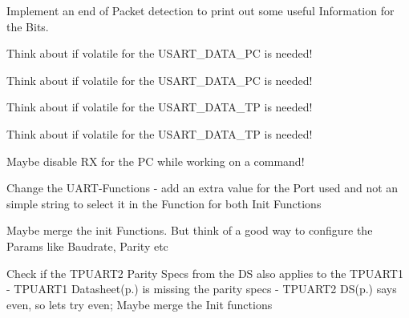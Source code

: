 
\begin{DoxyRefList}
\item[\label{todo__todo000002}%
\hypertarget{todo__todo000002}{}%
Global \hyperlink{shell_8h_ad95c9c45c97cc744ca49a98494bf9465}{act\+\_\+busmon} (void)]Implement an end of Packet detection to print out some useful Information for the Bits. 
\item[\label{todo__todo000008}%
\hypertarget{todo__todo000008}{}%
Global \hyperlink{_u_a_r_t_8c_a6c9949e5146d1feb028b0c2db8754523}{I\+SR} (U\+S\+A\+R\+T\+C1\+\_\+\+R\+X\+C\+\_\+vect)]Think about if volatile for the U\+S\+A\+R\+T\+\_\+\+D\+A\+T\+A\+\_\+\+PC is needed!  
\item[\label{todo__todo000009}%
\hypertarget{todo__todo000009}{}%
Global \hyperlink{_u_a_r_t_8c_acdf978f69a52b8a2225b0536b5fbff0e}{I\+SR} (U\+S\+A\+R\+T\+C1\+\_\+\+D\+R\+E\+\_\+vect)]Think about if volatile for the U\+S\+A\+R\+T\+\_\+\+D\+A\+T\+A\+\_\+\+PC is needed! 
\item[\label{todo__todo000007}%
\hypertarget{todo__todo000007}{}%
Global \hyperlink{_u_a_r_t_8c_abbfd0611f43db59ea4fdb1ea434cf017}{I\+SR} (U\+S\+A\+R\+T\+C0\+\_\+\+D\+R\+E\+\_\+vect)]Think about if volatile for the U\+S\+A\+R\+T\+\_\+\+D\+A\+T\+A\+\_\+\+TP is needed! 
\item[\label{todo__todo000006}%
\hypertarget{todo__todo000006}{}%
Global \hyperlink{_u_a_r_t_8c_aace195abde7bc36b7b50772ff2277dd4}{I\+SR} (U\+S\+A\+R\+T\+C0\+\_\+\+R\+X\+C\+\_\+vect)]Think about if volatile for the U\+S\+A\+R\+T\+\_\+\+D\+A\+T\+A\+\_\+\+TP is needed! 
\item[\label{todo__todo000001}%
\hypertarget{todo__todo000001}{}%
File \hyperlink{shell_8c}{shell.c} ]Maybe disable RX for the PC while working on a command!  
\item[\label{todo__todo000003}%
\hypertarget{todo__todo000003}{}%
File \hyperlink{_u_a_r_t_8c}{U\+A\+RT.c} ]Change the U\+A\+R\+T-\/\+Functions -\/ add an extra value for the Port used and not an simple string to select it in the Function for both Init Functions  
\item[\label{todo__todo000005}%
\hypertarget{todo__todo000005}{}%
Global \hyperlink{_u_a_r_t_8h_a267c0b0bf7f4f8b70049d91449590cf8}{usart\+\_\+init\+\_\+pc} (void)]Maybe merge the init Functions. But think of a good way to configure the Params like Baudrate, Parity etc  
\item[\label{todo__todo000004}%
\hypertarget{todo__todo000004}{}%
Global \hyperlink{_u_a_r_t_8h_a09e438e4f709b00836cebb0d6a44f223}{usart\+\_\+init\+\_\+tpuart} (void)]Check if the T\+P\+U\+A\+R\+T2 Parity Specs from the DS also applies to the T\+P\+U\+A\+R\+T1 -\/ T\+P\+U\+A\+R\+T1 Datasheet(p.) is missing the parity specs -\/ T\+P\+U\+A\+R\+T2 DS(p.) says even, so lets try even; Maybe merge the Init functions 
\end{DoxyRefList}